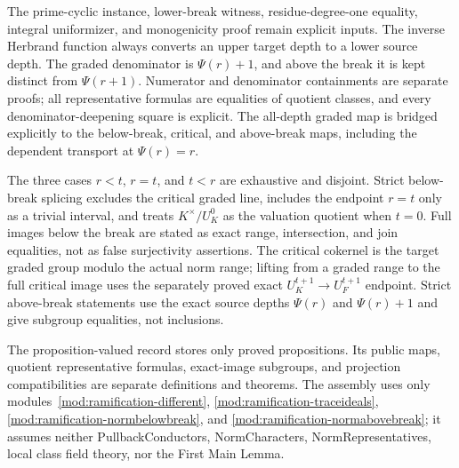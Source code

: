 \begin{theorem}
\leanok
{}
\FormalizationContract
The prime-cyclic instance, lower-break witness, residue-degree-one equality,
integral uniformizer, and monogenicity proof remain explicit inputs.
The inverse Herbrand function always converts an upper target depth to a
lower source depth.  The graded denominator is $\Psi(r)+1$, and above the
break it is kept distinct from $\Psi(r+1)$.  Numerator and denominator
containments are separate proofs; all representative formulas are
equalities of quotient classes, and every denominator-deepening square is
explicit.  The all-depth graded map is bridged explicitly to the
below-break, critical, and above-break maps, including the dependent
transport at $\Psi(r)=r$.

The three cases $r<t$, $r=t$, and $t<r$ are exhaustive and disjoint.
Strict below-break splicing excludes the critical graded line, includes the
endpoint $r=t$ only as a trivial interval, and treats
$K^\times/U_K^0$ as the valuation quotient when $t=0$.  Full images below
the break are stated as exact range, intersection, and join equalities, not
as false surjectivity assertions.  The critical cokernel is the target
graded group modulo the actual norm range; lifting from a graded range to
the full critical image uses the separately proved exact
$U_K^{t+1}\to U_F^{t+1}$ endpoint.  Strict above-break statements use the
exact source depths $\Psi(r)$ and $\Psi(r)+1$ and give subgroup equalities,
not inclusions.

The proposition-valued record stores only proved propositions.  Its public
maps, quotient representative formulas, exact-image subgroups, and
projection compatibilities are separate definitions and theorems.  The
assembly uses only modules~\ref{mod:ramification-different},
\ref{mod:ramification-traceideals},
\ref{mod:ramification-normbelowbreak}, and
\ref{mod:ramification-normabovebreak}; it assumes neither
PullbackConductors, NormCharacters, NormRepresentatives, local class field
theory, nor the First Main Lemma.
\end{theorem}
